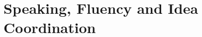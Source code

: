 \documentclass[
    12pt,
    a4paper,
    oneside,
    openany
]{book}
\begin{document}



\part{Speaking, Fluency and Idea Coordination}

\end{document}
